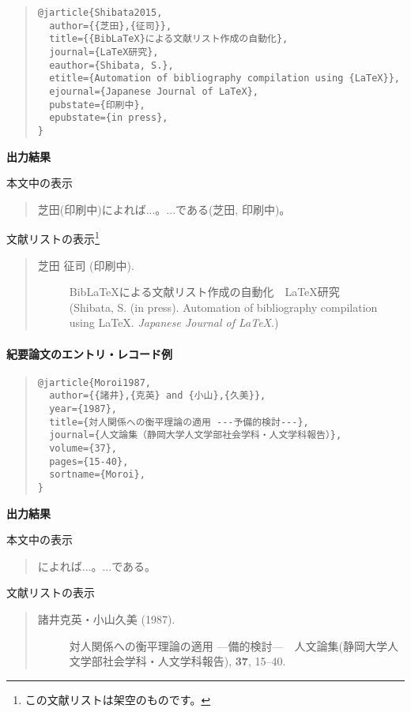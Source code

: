 \documentclass[12pt]{ltjsarticle}
\begin{document}
\begin{quote}
\begin{verbatim}
@jarticle{Shibata2015,
  author={{芝田},{征司}},
  title={{BibLaTeX}による文献リスト作成の自動化},
  journal={LaTeX研究},
  eauthor={Shibata, S.},
  etitle={Automation of bibliography compilation using {LaTeX}},
  ejournal={Japanese Journal of LaTeX},
  pubstate={印刷中},
  epubstate={in press},
}
\end{verbatim}
\end{quote}
\textcite{Shibata2015}

\textbf{出力結果}

本文中の表示
\begin{quote}
芝田(印刷中)によれば...。...である(芝田, 印刷中)。
\end{quote}


文献リストの表示\footnote{この文献リストは架空のものです。}
\begin{quote}
\begin{description}
  \item[\textrm{芝田 征司 (印刷中).}]{BibLaTeX}による文献リスト作成の自動化　LaTeX研究\\
(Shibata, S. (in press). Automation of bibliography compilation using LaTeX. \textit{Japanese Journal of LaTeX}.)
\end{description}
\end{quote}


\paragraph{紀要論文のエントリ・レコード例}

\begin{quote}
\begin{verbatim}
@jarticle{Moroi1987,
  author={{諸井},{克英} and {小山},{久美}},
  year={1987},
  title={対人関係への衡平理論の適用 ---予備的検討---},
  journal={人文論集（静岡大学人文学部社会学科・人文学科報告）},
  volume={37},
  pages={15-40},
  sortname={Moroi},
}
\end{verbatim}
\end{quote}


\textbf{出力結果}

本文中の表示
\begin{quote}
\textcite{Moroi1987}によれば...。...である\parencite{Moroi1987}。
\end{quote}


文献リストの表示
\begin{quote}
\begin{description}
  \item[\textrm{諸井克英・小山久美 (1987).}]対人関係への衡平理論の適用 ---備的検討---　人文論集(静岡大学人文学部社会学科・人文学科報告), \textbf{37}, 15--40.
\end{description}
\end{quote}
\end{document}
